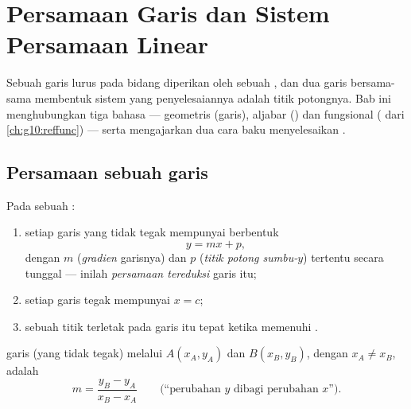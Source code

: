 \chapter{Persamaan Garis dan Sistem Persamaan Linear}\label{ch:g10:lines}

Sebuah garis lurus pada bidang  diperikan oleh sebuah , dan
dua garis bersama-sama membentuk sistem  yang penyelesaiannya adalah
titik potongnya. Bab ini menghubungkan tiga bahasa --- geometris
(garis), aljabar () dan fungsional ( dari
\cref{ch:g10:reffunc}) --- serta mengajarkan dua cara baku menyelesaikan
.

\section{Persamaan sebuah garis}

\begin{theorem}\label{thm:g10:lines:reduced}
Pada sebuah :
\begin{enumerate}
  \item setiap garis yang tidak tegak mempunyai  berbentuk
        \[
        y = mx + p ,
        \]
        dengan $m$ (\emph{gradien} garisnya) dan $p$
        (\emph{titik potong sumbu-$y$}) tertentu secara tunggal --- inilah
        \emph{persamaan tereduksi} garis itu;
  \item setiap garis tegak mempunyai  $x = c$;
  \item sebuah titik terletak pada garis itu tepat ketika 
        memenuhi .
\end{enumerate}
\end{theorem}
\admitted

\begin{proposition}\label{prop:g10:lines:slope}
 garis (yang tidak tegak) melalui $A(x_A, y_A)$ dan
$B(x_B, y_B)$, dengan $x_A \neq x_B$, adalah
\[
m = \frac{y_B - y_A}{x_B - x_A}
\qquad
\text{(``perubahan $y$ dibagi perubahan $x$'').}
\]
\end{proposition}

